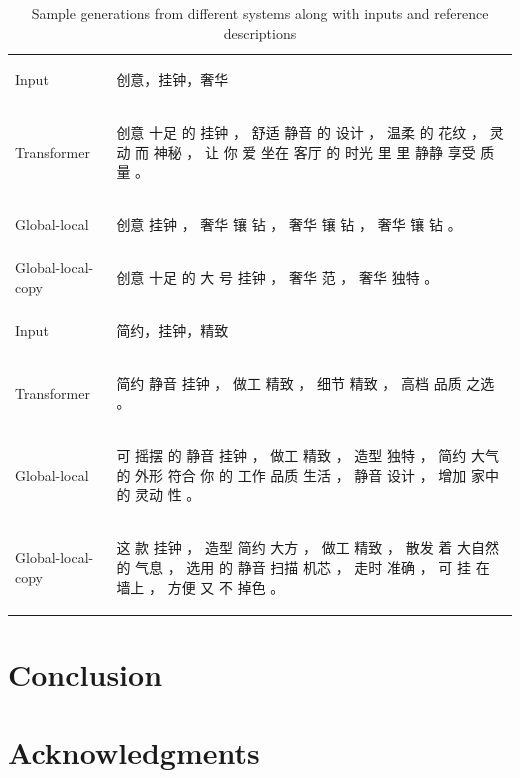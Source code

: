 \documentclass[sigconf]{acmart}
\begin{document}
\begin{table}
  \caption{Sample generations from different systems along with inputs and reference descriptions}
  \label{table:case}
  \begin{tabular}{p{2.5cm}p{12cm}}
    \hline
    Input & 
    \begin{CJK*}{UTF8}{gbsn}
        创意，挂钟，奢华
    \end{CJK*} \\
    Transformer & 
    \begin{CJK*}{UTF8}{gbsn}
        创意 十足 的 挂钟 ， 舒适 静音 的 设计 ， 温柔 的 花纹 ， 灵动 而 神秘 ， 让 你 爱 坐在 客厅 的 时光 里 里 静静 享受 质量 。
    \end{CJK*} \\
    Global-local & 
    \begin{CJK*}{UTF8}{gbsn}
        创意 挂钟 ， 奢华 镶 钻 ， 奢华 镶 钻 ， 奢华 镶 钻 。
    \end{CJK*} \\
    Global-local-copy & 
    \begin{CJK*}{UTF8}{gbsn}
        创意 十足 的 大 号 挂钟 ， 奢华 范 ， 奢华 独特 。
    \end{CJK*} \\
    \hline
    Input & 
    \begin{CJK*}{UTF8}{gbsn}
        简约，挂钟，精致
    \end{CJK*} \\
    Transformer & 
    \begin{CJK*}{UTF8}{gbsn}
        简约 静音 挂钟 ， 做工 精致 ， 细节 精致 ， 高档 品质 之选 。
    \end{CJK*} \\
    Global-local & 
    \begin{CJK*}{UTF8}{gbsn}
        可 摇摆 的 静音 挂钟 ， 做工 精致 ， 造型 独特 ， 简约 大气 的 外形 符合 你 的 工作 品质 生活 ， 静音 设计 ， 增加 家中 的 灵动 性 。
    \end{CJK*} \\
    Global-local-copy & 
    \begin{CJK*}{UTF8}{gbsn}
        这 款 挂钟 ， 造型 简约 大方 ， 做工 精致 ， 散发 着 大自然 的 气息 ， 选用 的 静音 扫描 机芯 ， 走时 准确 ， 可 挂 在 墙上 ， 方便 又 不 掉色 。
    \end{CJK*} \\
  \bottomrule
\end{tabular}
\end{table}

\section{Conclusion}\label{sec:conclusion}

\section{Acknowledgments}



\end{document}
